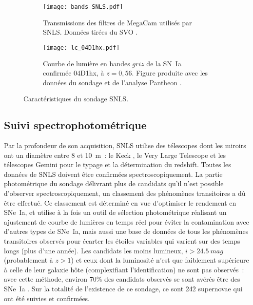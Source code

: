 \documentclass[../main/main.tex]{subfiles}
\begin{document}
\begin{figure}[ht]
    \centering
    \begin{subfigure}[]{.49\linewidth}
        \centering
        \texttt{[image: bands\_SNLS.pdf]}
        \caption{Transmissions des filtres de MegaCam utilisés par SNLS. Données
        tirées du SVO \citep{rodrigo2020}.}
        \label{fig:snlsbands}
    \end{subfigure}
    \begin{subfigure}[]{.49\linewidth}
        \centering
        \texttt{[image: lc\_04D1hx.pdf]}
        \caption{Courbe de lumière en bandes $griz$ de la SN~Ia confirmée
        04D1hx, à $z = 0,56$. Figure produite avec les données du
        sondage et de l'analyse Pantheon \citep{scolnic2018}.}
        \label{fig:snlslc}
    \end{subfigure}
    \caption{Caractéristiques du sondage SNLS.}
\end{figure}

\subsection{Suivi spectrophotométrique}\label{ssec:snlsspectro}

Par la profondeur de son acquisition, SNLS utilise des télescopes dont les
miroirs ont un diamètre entre 8 et \SI{10}{m}~: le Keck \citep{oke1995,
ellis2008}, le Very Large Telescope \citep[VLT,][]{balland2009} et les
télescopes Gemini \citep{hook2004} pour le typage et la détermination du
redshift. Toutes les données de SNLS doivent être confirmées
spectroscopiquement. La partie photométrique du sondage délivrant plus de
candidats qu'il n'est possible d'observer spectroscopiquement, un classement des
phénomènes transitoires a dû être effectué. Ce classement est déterminé en vue
d'optimiser le rendement en SNe~Ia, et utilise à la fois un outil de sélection
photométrique réalisant un ajustement de courbe de lumières en temps réel pour
éviter la contamination avec d'autres types de SNe~Ia, mais aussi
une base de données de tous les phénomènes transitoires observés pour écarter
les étoiles variables qui varient sur des temps longs (plus d'une année). Les
candidats les moins lumineux, $i > \SI{24,5}{mag}$ (probablement à $z > 1$) et
ceux dont la luminosité n'est que faiblement supérieure à celle de leur galaxie
hôte (complexifiant l'identification) ne sont pas observés~: avec cette méthode,
environ 70\% des candidats observés se sont avérés être des SNe~Ia
\citep{astier2006}. Sur la totalité de l'existence de ce sondage, ce sont 242
supernovae qui ont été suivies et confirmées.
\end{document}

